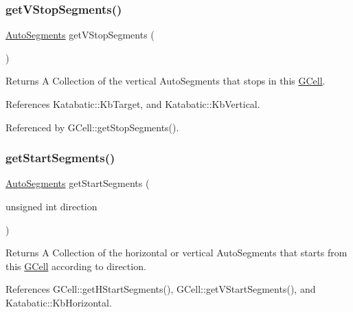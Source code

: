 \subsubsection{\texorpdfstring{get\+V\+Stop\+Segments()}{getVStopSegments()}}
{\footnotesize\ttfamily \mbox{\hyperlink{namespaceKatabatic_a2221b0ddbc24f331809fc86f98e38041}{Auto\+Segments}} get\+V\+Stop\+Segments (\begin{DoxyParamCaption}{ }\end{DoxyParamCaption})}

\begin{DoxyReturn}{Returns}
A Collection of the vertical Auto\+Segments that stops in this \mbox{\hyperlink{classKatabatic_1_1GCell}{G\+Cell}}. 
\end{DoxyReturn}


References Katabatic\+::\+Kb\+Target, and Katabatic\+::\+Kb\+Vertical.



Referenced by G\+Cell\+::get\+Stop\+Segments().

\mbox{\label{classKatabatic_1_1GCell_a1f92568d22b1384a8cdf328340fb9160}} 
\subsubsection{\texorpdfstring{get\+Start\+Segments()}{getStartSegments()}}
{\footnotesize\ttfamily \mbox{\hyperlink{namespaceKatabatic_a2221b0ddbc24f331809fc86f98e38041}{Auto\+Segments}} get\+Start\+Segments (\begin{DoxyParamCaption}\item[{unsigned int}]{direction }\end{DoxyParamCaption})\hspace{0.3cm}{\ttfamily [inline]}}

\begin{DoxyReturn}{Returns}
A Collection of the horizontal or vertical Auto\+Segments that starts from this \mbox{\hyperlink{classKatabatic_1_1GCell}{G\+Cell}} according to {\ttfamily direction}. 
\end{DoxyReturn}


References G\+Cell\+::get\+H\+Start\+Segments(), G\+Cell\+::get\+V\+Start\+Segments(), and Katabatic\+::\+Kb\+Horizontal.

